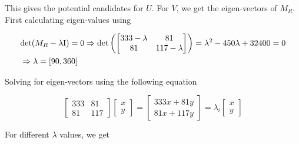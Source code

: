 This gives the potential candidates for $U$. For $V$, we get the eigen-vectors of $M_R$. First calculating eigen-values using

\begin{align}
    &\textup{det}(M_R - \lambda \textup{I}) = 0 \Rightarrow
    \textup{det} \left ( \begin{bmatrix}
        333 - \lambda & 81 \\
        81 & 117 - \lambda
        \end{bmatrix} \right ) = \lambda^2 - 450 \lambda + 32400 = 0 
    \nonumber \\
    &\Rightarrow \lambda = \left [ 90, 360 \right ]
    \nonumber
\end{align}

Solving for eigen-vectors using the following equation

\begin{equation}
    \begin{bmatrix}
        333 & 81 \\
        81 & 117
        \end{bmatrix} \begin{bmatrix}
        x \\ y
        \end{bmatrix} = \begin{bmatrix}
        333x + 81y \\
        81x + 117y
        \end{bmatrix} = \lambda_i \begin{bmatrix}
        x \\ y
        \end{bmatrix}
\end{equation}

For different $\lambda$ values, we get

